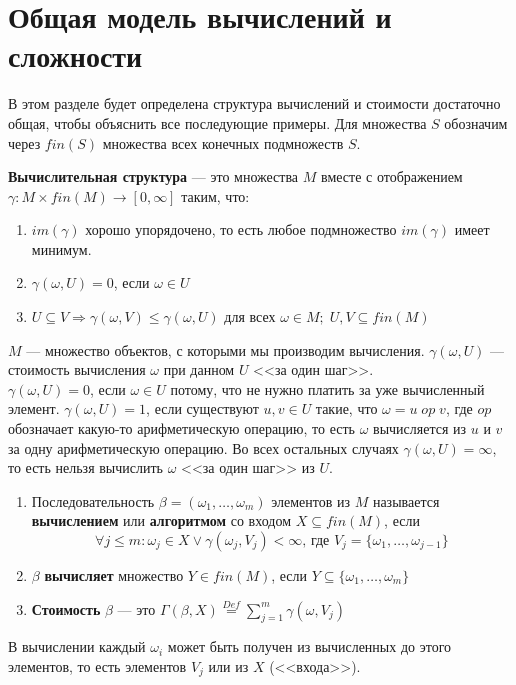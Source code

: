 \section{Общая модель вычислений и сложности}\label{sec:general_model}

В этом разделе будет определена структура вычислений и стоимости достаточно общая, чтобы объяснить все последующие примеры. Для множества $S$ обозначим через $fin(S)$ множества всех конечных подмножеств $S$.

\begin{definition}
  \textbf{Вычислительная структура} --- это множества $M$ вместе с отображением $\gamma:M \times fin(M) \to [0, \infty]$ таким, что:
  \begin{enumerate}[1.]
    \item $im(\gamma)$ хорошо упорядочено, то есть любое подмножество $im(\gamma)$ имеет минимум.
    \item $\gamma(\omega,U)=0$, если $\omega \in U$
    \item $U \subseteq V \Longrightarrow \gamma(\omega,V) \leq \gamma(\omega,U) $ для всех $\omega \in M; \; U,V \subseteq fin(M)$
  \end{enumerate}
\end{definition}

$M$ --- множество объектов, с которыми мы производим вычисления. $\gamma(\omega,U)$ --- стоимость вычисления $\omega$ при данном $U$ <<за один шаг>>. \\
$\gamma(\omega,U)=0$, если $\omega \in U$ потому, что не нужно платить за уже вычисленный элемент. $\gamma(\omega,U)=1$, если существуют $u,v \in U$ такие, что $\omega = u\; op\; v$, где $op$ обозначает какую-то арифметическую операцию, то есть $\omega$ вычисляется из $u$ и $v$ за одну арифметическую операцию. Во всех остальных случаях $\gamma(\omega,U)=\infty$, то есть нельзя вычислить $\omega$ <<за один шаг>> из $U$.

\begin{definition}
  \begin{enumerate}[1.]
	\item  Последовательность $\beta=(\omega_1, \ldots, \omega_m)$ элементов из $M$ называется \textbf{вычислением} или \textbf{алгоритмом} со входом $X \subseteq fin(M)$, если
    	\[
    		\forall j \leq m: \omega_j \in X \lor \gamma(\omega_j, V_j) < \infty \mbox{, где } V_j = \{ \omega_1, \ldots, \omega_{j-1} \}
    	\]
    	\item $\beta$ \textbf{вычисляет} множество $Y \in fin(M)$, если $Y \subseteq \{ \omega_1, \ldots, \omega_m \}$
    	\item \textbf{Стоимость} $\beta$ --- это $\Gamma(\beta, X) \overset{Def}{=} \sum\limits_{j=1}^{m} \gamma(\omega,V_j)$  
  \end{enumerate}
\end{definition}
В вычислении каждый $\omega_i$ может быть получен из вычисленных до этого элементов, то есть элементов $V_j$ или из $X$ (<<входа>>).

